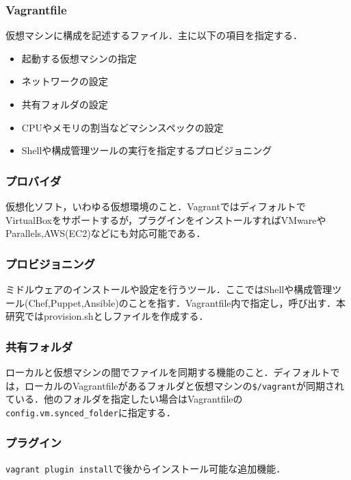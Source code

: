 \subsubsection{Vagrantfile}

仮想マシンに構成を記述するファイル．主に以下の項目を指定する．

\begin{itemize}
\item 起動する仮想マシンの指定
\item ネットワークの設定
\item 共有フォルダの設定
\item CPUやメモリの割当などマシンスペックの設定
\item Shellや構成管理ツールの実行を指定するプロビジョニング
\end{itemize}

\subsubsection{プロバイダ}

仮想化ソフト，いわゆる仮想環境のこと．VagrantではディフォルトでVirtualBoxをサポートするが，プラグインをインストールすればVMwareやParallels,AWS(EC2)などにも対応可能である．

\subsubsection{プロビジョニング}

ミドルウェアのインストールや設定を行うツール．ここではShellや構成管理ツール(Chef,Puppet,Ansible)のことを指す．Vagrantfile内で指定し，呼び出す．本研究ではprovision.shとしファイルを作成する．

\subsubsection{共有フォルダ}

ローカルと仮想マシンの間でファイルを同期する機能のこと．ディフォルトでは，ローカルのVagrantfileがあるフォルダと仮想マシンの\texttt{\$/vagrant}が同期されている．他のフォルダを指定したい場合はVagrantfileの\texttt{config.vm.synced\_folder}に指定する．

\subsubsection{プラグイン}

\texttt{vagrant plugin install}で後からインストール可能な追加機能．

